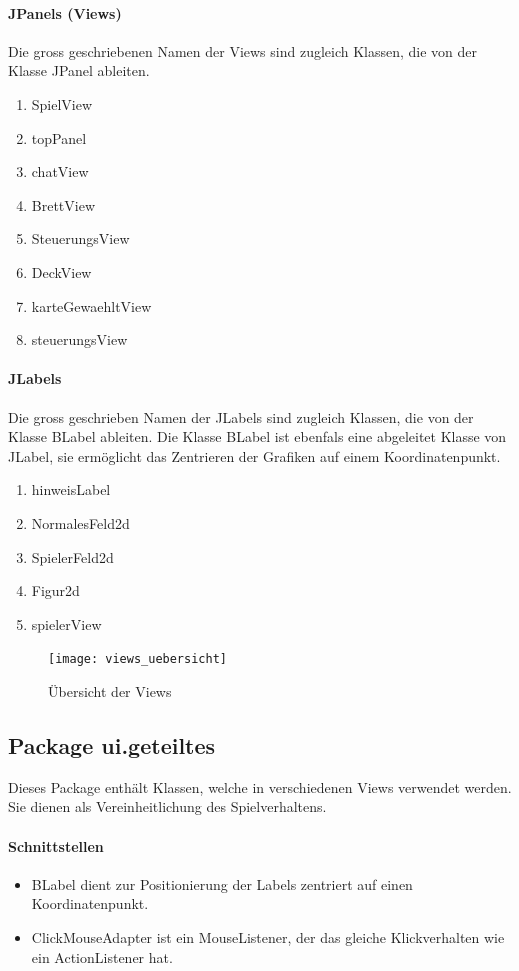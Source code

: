 \documentclass[12pt,halfparskip]{scrartcl}
\begin{document}
\paragraph{JPanels (Views)}
Die gross geschriebenen Namen der Views sind zugleich Klassen, die von der Klasse JPanel ableiten.
\begin{enumerate}
	\item SpielView
	\item topPanel
	\item chatView
	\item BrettView
	\item SteuerungsView
	\item DeckView
	\item karteGewaehltView
	\item steuerungsView
\end{enumerate}

\paragraph{JLabels}
Die gross geschrieben Namen der JLabels sind zugleich Klassen, die von der Klasse BLabel ableiten. Die Klasse BLabel ist ebenfals eine abgeleitet Klasse von JLabel, sie ermöglicht das Zentrieren der Grafiken auf einem Koordinatenpunkt.

\begin{enumerate}
	\item hinweisLabel
	\item NormalesFeld2d
	\item SpielerFeld2d
	\item Figur2d
	\item spielerView
\end{enumerate}

\begin{figure}[H]
	\centering
	\texttt{[image: views\_uebersicht]}
	\caption{Übersicht der Views}
	\label{fig:views_uebersicht}
\end{figure}

\clearpage
\subsection{Package ui.geteiltes}

Dieses Package enthält Klassen, welche in verschiedenen Views verwendet werden. Sie dienen als Vereinheitlichung des Spielverhaltens.

\paragraph{Schnittstellen}
\begin{itemize}
	\item BLabel dient zur Positionierung der Labels zentriert auf einen Koordinatenpunkt.
	\item ClickMouseAdapter ist ein MouseListener, der das gleiche Klickverhalten wie ein ActionListener hat.
\end{itemize}
\end{document}
